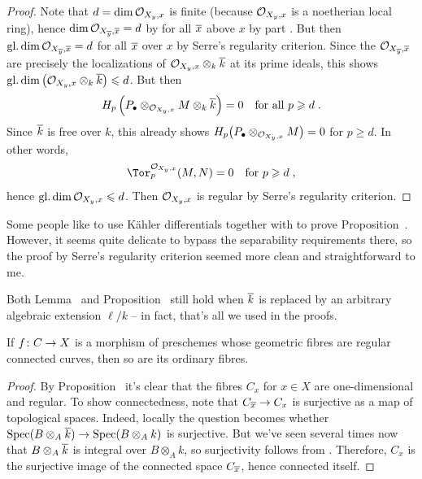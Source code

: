 \documentclass[a4paper,parskip=half,numbers=enddot, DIV=12]{scrreprt}
\renewcommand{\geq}{\geqslant}
\renewcommand{\leq}{\leqslant}
\begin{document}
\begin{proof}
	 Note that $d=\dim\mathcal{O}_{X_y,x}$ is finite (because $\mathcal{O}_{X_y,x}$ is a noetherian local ring), hence $\dim\mathcal{O}_{X_{\overline{y}},\overline{x}}=d$ by for all $\overline{x}$ above $x$ by part . But then $\operatorname{gl.dim}\mathcal{O}_{X_{\overline{y}},\overline{x}}= d$ for all $\overline{x}$ over $x$ by Serre's regularity criterion. Since the $\mathcal{O}_{X_{\overline{y}},\overline{x}}$ are precisely the localizations of $\mathcal{O}_{X_y,x}\otimes_k\overline{k}$ at its prime ideals, this shows $\gdim\big(\Oo_{X_y,x}\otimes_k\ov{k}\big)\leq d$. But then
	 \begin{align*}
	 	H_p\left(P_\bullet\otimes_{\Oo_{X_y,x}}M\otimes_k\ov{k}\right)=0\quad\text{for all }p\geq d\;.
	 \end{align*}
	 Since $\overline{k}$ is free over $k$, this already shows $H_p\big(P_\bullet\otimes_{\mathcal{O}_{X_y,x}}M\big)=0$ for $p\geq d$. In other words, 
	 \begin{align*}
	 	\Tor_p^{\Oo_{X_y,x}}(M,N)=0\quad\text{for }p\geq d\;,
	 \end{align*}
	 hence $\gdim\Oo_{X_y,x}\leq d$. Then $\mathcal{O}_{X_y,x}$ is regular by Serre's regularity criterion.
\end{proof}
\begin{rem}
	\begin{alphanumerate}
		\item Some people like to use Kähler differentials together with \cite[Proposition~1.6.3]{alg2} to prove Proposition~. However, it seems quite delicate to bypass the separability requirements there, so the proof by Serre's regularity criterion seemed more clean and straightforward to me.
		\item Both Lemma~ and Proposition~ still hold when $\overline{k}$ is replaced by an arbitrary algebraic extension $\ell/k$ -- in fact, that's all we used in the proofs.
	\end{alphanumerate}
\end{rem}
\begin{cor}
	If $f\colon C\morphism X$ is a morphism of preschemes whose geometric fibres are regular connected curves, then so are its ordinary fibres.
\end{cor}
\begin{proof}
	By Proposition~ it's clear that the fibres $C_x$ for $x\in X$ are one-dimensional and regular. To show connectedness, note that $C_{\ov{x}}\morphism C_x$ is surjective as a map of topological spaces. Indeed, locally the question becomes whether $\Spec(B\otimes_A\ov{k})\morphism\Spec (B\otimes_Ak)$ is surjective. But we've seen several times now that $B\otimes_A\overline{k}$ is integral over $B\otimes_Ak$, so surjectivity follows from \cite[Theorem~7]{alg1}. Therefore, $C_x$ is the surjective image of the connected space $C_{\overline{x}}$, hence connected itself.
\end{proof}
\end{document}
